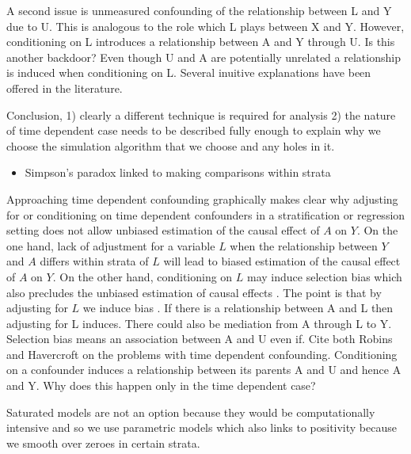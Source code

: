 \documentclass[11pt]{article}
\providecommand{\tightlist}{%
      \setlength{\itemsep}{0pt}\setlength{\parskip}{0pt}}
\begin{document}
A second issue is unmeasured confounding of the relationship between L
and Y due to U. This is analogous to the role which L plays between X
and Y. However, conditioning on L introduces a relationship between A
and Y through U. Is this another backdoor? Even though U and A are
potentially unrelated a relationship is induced when conditioning on L.
Several inuitive explanations have been offered in the literature.
\linebreak

Conclusion, 1) clearly a different technique is required for analysis 2)
the nature of time dependent case needs to be described fully enough to
explain why we choose the simulation algorithm that we choose and any
holes in it.

\begin{itemize}
\tightlist
\item
  Simpson's paradox linked to making comparisons within strata
\end{itemize}

Approaching time dependent confounding graphically makes clear why
adjusting for or conditioning on time dependent confounders in a
stratification or regression setting does not allow unbiased estimation
of the causal effect of \(A\) on \(Y\). On the one hand, lack of
adjustment for a variable \(L\) when the relationship between \(Y\) and
\(A\) differs within strata of \(L\) will lead to biased estimation of
the causal effect of \(A\) on \(Y\). On the other hand, conditioning on
\(L\) may induce selection bias which also precludes the unbiased
estimation of causal effects \citet{Hernan2004}. The point is that by
adjusting for \(L\) we induce bias . If there is a relationship between
A and L then adjusting for L induces. There could also be mediation from
A through L to Y. Selection bias means an association between A and U
even if. Cite both Robins and Havercroft on the problems with time
dependent confounding. Conditioning on a confounder induces a
relationship between its parents A and U and hence A and Y. Why does
this happen only in the time dependent case?

Saturated models are not an option because they would be computationally
intensive and so we use parametric models which also links to positivity
because we smooth over zeroes in certain strata.
\end{document}
